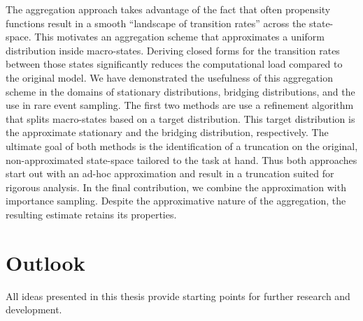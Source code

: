 The aggregation approach takes advantage of the fact that often
propensity functions result in a smooth ``landscape of transition
rates'' across the state-space.
This motivates an aggregation scheme that approximates a uniform
distribution inside macro-states.
Deriving closed forms for the transition rates between those states
significantly reduces the computational load compared to the original model.
We have demonstrated the usefulness of this aggregation scheme in the
domains of stationary distributions, bridging distributions, and the
use in rare event sampling.
The first two methods are use a refinement algorithm that splits
macro-states based on a target distribution.
This target distribution is the approximate stationary and the
bridging distribution, respectively.
The ultimate goal of both methods is the identification of a
truncation on the original, non-approximated state-space tailored to
the task at hand.
Thus both approaches start out with an ad-hoc approximation and
result in a truncation suited for rigorous analysis.
In the final contribution, we combine the approximation with
importance sampling.
Despite the approximative nature of the aggregation, the resulting
estimate retains its properties.


\section{Outlook}
All ideas presented in this thesis provide starting points for
further research and development.

